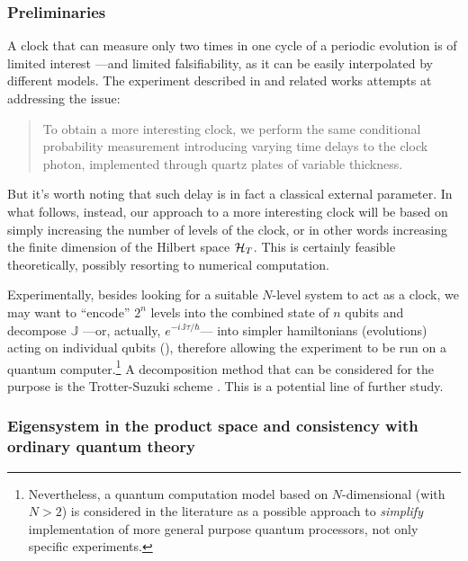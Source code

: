 \subsubsection{Preliminaries}

A clock that can measure only two times in one cycle of a periodic evolution
is of limited interest ---and limited falsifiability, as it can be easily
interpolated by different models.
The experiment described in
\cite{Moreva:synthetic} and related works attempts at addressing the issue:
\begin{quote}
  To obtain a more interesting clock, we perform the same conditional probability measurement
  introducing varying time delays to the clock photon, implemented through quartz plates of
  variable thickness.
\end{quote}
But it's worth noting that such delay is in fact a classical external parameter.
%
In what follows, instead, our approach to a more interesting clock will be based on simply
increasing the number of levels of the clock, or in other words increasing the
finite dimension of the Hilbert space $\mathcal{H}_T$. This is certainly feasible
theoretically, possibly resorting to numerical computation.
\begin{remark}
  Experimentally,
  besides looking for a suitable $N$-level system to act as a clock,
  we may want to ``encode'' $2^{n}$ levels into the combined state of $n$
  qubits and
  decompose $\mathbb{J}$ ---or, actually, $e^{-i\mathbb{J}\tau/\hbar}$---
  into simpler hamiltonians (evolutions)
  acting on individual qubits (),
  therefore allowing the experiment to be run on a quantum computer.\footnote{
    Nevertheless, a quantum computation model based on
    $N$-dimensional 
    (with $N > 2$)
    is considered in the literature \parencite{QuditComp, Qudit}
    as a possible approach to \emph{simplify} implementation
    of more general purpose quantum processors, not only specific experiments.
  }
  A decomposition method that can be considered for the purpose
  is the Trotter-Suzuki scheme
  \parencite{Trotter-Suzuki:exp, Trotter-Suzuki:GPU}.
  This is a potential line of further study.
\end{remark}

\subsubsection{Eigensystem in the product space and consistency with ordinary quantum \mbox{theory}}

